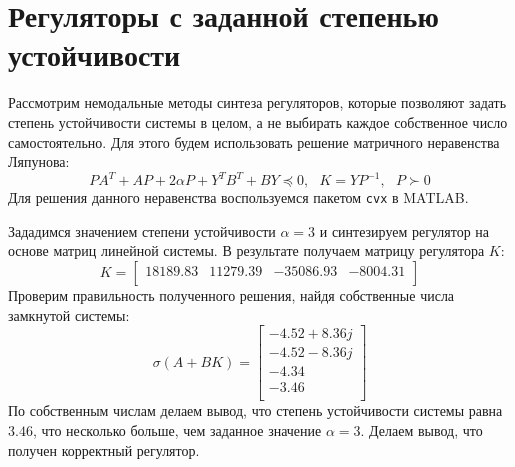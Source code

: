 \section{Регуляторы с заданной степенью устойчивости}
Рассмотрим немодальные методы синтеза регуляторов, которые позволяют задать степень устойчивости системы
в целом, а не выбирать каждое собственное число самостоятельно. Для этого будем использовать 
решение матричного неравенства Ляпунова: 
\begin{equation}
    PA^T + AP + 2\alpha P + Y^T B^T + BY \preceq 0, ~~~ K = Y P^{-1}, ~~~ P \succ 0
\end{equation}
Для решения данного неравенства воспользуемся пакетом \texttt{cvx} в MATLAB. 

Зададимся значением степени устойчивости $\alpha = 3$ и синтезируем регулятор на основе матриц линейной системы. 
В результате получаем матрицу регулятора $K$: 
\begin{equation}
    K = \begin{bmatrix}
    18189.83  & 11279.39  & -35086.93  & -8004.31 \\ 
    \end{bmatrix}
\end{equation}
Проверим правильность полученного решения, найдя собственные числа замкнутой системы:
\begin{equation}
    \sigma(A + BK) = \begin{bmatrix}
    -4.52 + 8.36j \\ 
    -4.52 - 8.36j \\ 
    -4.34 \\ 
    -3.46 \\ 
    \end{bmatrix}
\end{equation}
По собственным числам делаем вывод, что степень устойчивости системы равна $3.46$, 
что несколько больше, чем заданное значение $\alpha = 3$. Делаем вывод, что 
получен корректный регулятор. 

